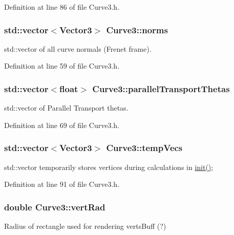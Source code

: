 Definition at line 86 of file Curve3.\-h.

\hypertarget{class_curve3_a9464b3b2baa1a520c5cda6ea19147e71}{
\subsubsection[{norms}]{\setlength{\rightskip}{0pt plus 5cm}std\-::vector$<${\bf Vector3}$>$ Curve3\-::norms\hspace{0.3cm}{\ttfamily [protected]}}}\label{class_curve3_a9464b3b2baa1a520c5cda6ea19147e71}
std\-::vector of all curve normals (Frenet frame). 

Definition at line 59 of file Curve3.\-h.

\hypertarget{class_curve3_aa3c9c1b951d6d8d280a00659ced8a503}{
\subsubsection[{parallel\-Transport\-Thetas}]{\setlength{\rightskip}{0pt plus 5cm}std\-::vector$<$float$>$ Curve3\-::parallel\-Transport\-Thetas\hspace{0.3cm}{\ttfamily [protected]}}}\label{class_curve3_aa3c9c1b951d6d8d280a00659ced8a503}
std\-::vector of Parallel Transport thetas. 

Definition at line 69 of file Curve3.\-h.

\hypertarget{class_curve3_a527d3cb7d51e3896b93cf048920345f2}{
\subsubsection[{temp\-Vecs}]{\setlength{\rightskip}{0pt plus 5cm}std\-::vector$<${\bf Vector3}$>$ Curve3\-::temp\-Vecs\hspace{0.3cm}{\ttfamily [protected]}}}\label{class_curve3_a527d3cb7d51e3896b93cf048920345f2}
std\-::vector temporarily stores vertices during calculations in \hyperlink{class_curve3_a5bffd69c283961491c639c459d2c06d2}{init()}; 

Definition at line 91 of file Curve3.\-h.

\hypertarget{class_curve3_a404b74eb4ad6ac9796b766ff1a36d823}{
\subsubsection[{vert\-Rad}]{\setlength{\rightskip}{0pt plus 5cm}double Curve3\-::vert\-Rad\hspace{0.3cm}{\ttfamily [protected]}}}\label{class_curve3_a404b74eb4ad6ac9796b766ff1a36d823}
Radius of rectangle used for rendering verts\-Buff (?) 

